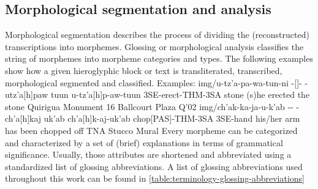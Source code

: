\documentclass[../main.tex]{subfiles}
\begin{document}
\subsection{Morphological segmentation and analysis}
Morphological segmentation describes the process of dividing the (reconstructed) transcriptions into
morphemes.
Glossing or morphological analysis classifies the string of morphemes into morpheme categories 
and types.
The following examples show how a given hieroglyphic block or text is transliterated, transcribed,
morphological segmented and classified.
\newline
Examples:
\vspace{1em}
\newline
\glyphanalysis
    {img/u-tz'a-pa-wa-tun-ni}
    {-[]- 
    -}
    {utz'a[h]paw tuun}
    {u-tz'a[h]p-aw-\zeromorpheme tuun}
    {3SE-erect-THM-3SA stone}
    {(s)he erected the stone}
    {Quirigua Monument 16 Ballcourt Plaza Q'02}
\glyphanalysis
    {img/ch'ak-ka-ja-u-k'ab}
    {--
    -}
    {ch'a[h]kaj uk'ab}
    {ch'a[h]k-aj-\zeromorpheme uk'ab}
    {chop[PAS]-THM-3SA 3SE-hand}
    {his/her arm has been chopped off}
    {TNA Stucco Mural}
Every morpheme can be categorized and characterized by a set of (brief) explanations in terms 
of grammatical significance. 
Usually, those attributes are shortened and abbreviated using a standardized list of 
glossing abbreviations.
A list of glossing abbreviations used throughout this work can be found in 
\cref{table:terminology-glossing-abbreviations}
\end{document}
